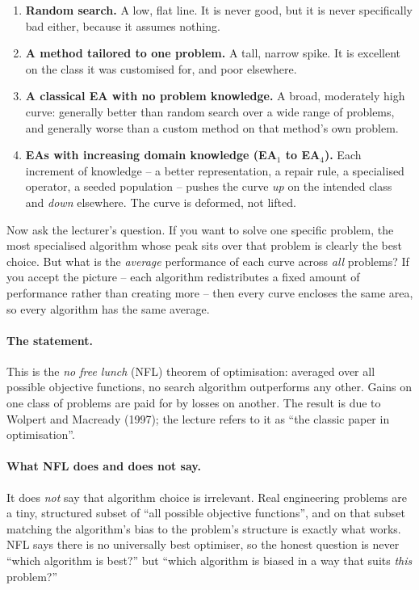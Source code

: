 \documentclass[11pt,a4paper]{article}
\begin{document}
\begin{enumerate}
\item \textbf{Random search.} A low, flat line. It is never good, but it is
      never specifically bad either, because it assumes nothing.
\item \textbf{A method tailored to one problem.} A tall, narrow spike. It is
      excellent on the class it was customised for, and poor elsewhere.
\item \textbf{A classical EA with no problem knowledge.} A broad, moderately
      high curve: generally better than random search over a wide range of
      problems, and generally worse than a custom method on that method's own
      problem.
\item \textbf{EAs with increasing domain knowledge (EA$_1$ to EA$_4$).} Each
      increment of knowledge -- a better representation, a repair rule, a
      specialised operator, a seeded population -- pushes the curve
      \emph{up} on the intended class and \emph{down} elsewhere. The curve is
      deformed, not lifted.
\end{enumerate}

Now ask the lecturer's question. If you want to solve one specific problem,
the most specialised algorithm whose peak sits over that problem is clearly
the best choice. But what is the \emph{average} performance of each curve
across \emph{all} problems? If you accept the picture -- each algorithm
redistributes a fixed amount of performance rather than creating more -- then
every curve encloses the same area, so every algorithm has the same average.

\paragraph{The statement.} This is the \emph{no free lunch} (NFL) theorem of
optimisation: averaged over all possible objective functions, no search
algorithm outperforms any other. Gains on one class of problems are paid for
by losses on another. The result is due to Wolpert and Macready (1997); the
lecture refers to it as ``the classic paper in optimisation''.

\paragraph{What NFL does and does not say.} It does \emph{not} say that
algorithm choice is irrelevant. Real engineering problems are a tiny,
structured subset of ``all possible objective functions'', and on that subset
matching the algorithm's bias to the problem's structure is exactly what
works. NFL says there is no universally best optimiser, so the honest
question is never ``which algorithm is best?'' but ``which algorithm is
biased in a way that suits \emph{this} problem?''
\end{document}
